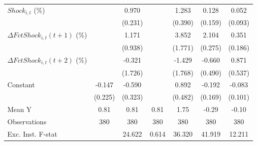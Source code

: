 {\begin{tabular}{l*{6}{c}}
\addlinespace
$ Shock_{i,t}$ (\%) &                     &       0.970\sym{***}&                     &       1.283\sym{***}&       0.128         &       0.052         \\
                    &                     &     (0.231)         &                     &     (0.390)         &     (0.159)         &     (0.093)         \\
\addlinespace
$ \Delta FctShock_{i,t}(t+1)$ (\%)&                     &       1.171         &                     &       3.852\sym{**} &       2.104\sym{***}&       0.351\sym{*}  \\
                    &                     &     (0.938)         &                     &     (1.771)         &     (0.275)         &     (0.186)         \\
\addlinespace
$ \Delta FctShock_{i,t}(t+2)$ (\%)&                     &      -0.321         &                     &      -1.429         &      -0.660         &       0.871         \\
                    &                     &     (1.726)         &                     &     (1.768)         &     (0.490)         &     (0.537)         \\
\addlinespace
Constant            &      -0.147         &      -0.590\sym{*}  &                     &       0.892\sym{*}  &      -0.192         &      -0.083         \\
                    &     (0.225)         &     (0.323)         &                     &     (0.482)         &     (0.169)         &     (0.101)         \\
\midrule
Mean Y              &        0.81         &        0.81         &        0.81         &        1.75         &       -0.29         &       -0.10         \\
Observations        &         380         &         380         &         380         &         380         &         380         &         380         \\
Exc. Inst. F-stat   &                     &      24.622         &       0.614         &      36.320         &      41.919         &      12.211         \\
\bottomrule
\end{tabular}
}
